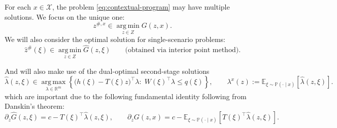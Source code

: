 \documentclass{article}
\newcommand{\R}{\mathbb{R}}
\newcommand{\E}{\mathbb{E}}
\newcommand{\argmin}{\operatorname*{arg\,min}}
\newcommand{\argmax}{\operatorname*{arg\,max}}
\theoremstyle{plain}
\begin{document}
For each $x\in\mathcal X$, the problem \eqref{eq:contextual-program} may have multiple solutions. We focus on
the unique one:
\begin{equation}
\label{eq:canonical-contextual-solution}
z^{\#,x}\in\argmin_{z\in Z}G(z,x).
\end{equation}
We will also consider the optimal solution for single-scenario problems:
\begin{equation}
\label{eq:canonical-single-scenario}
\hat z^{\#}(\xi)\in\argmin_{z\in Z}\hat G(z,\xi)\qquad \text{(obtained via interior point method)}.
\end{equation}

And will also make use of the dual-optimal second-stage solutions
\begin{equation}
\label{eq:contextual-dual}
\hat\lambda(z,\xi)\in
\argmax_{\lambda\in\R^{m}}
\left\{
\big(h(\xi)-T(\xi)z\big)^\top\lambda:\;W(\xi)^\top\lambda\le q(\xi)
\right\},
\qquad
\lambda^x(z):=\E_{\xi\sim\mathbb P(\cdot\mid x)}\!\left[\hat\lambda(z,\xi)\right].
\end{equation}
which are important due to the following fundamental identity following from Danskin's theorem:
\begin{equation}
\label{eq:danskin-contextual}
\partial_z \hat G(z,\xi)=c-T(\xi)^\top\hat\lambda(z,\xi),
\qquad
\partial_z G(z,x)=c-\E_{\xi\sim\mathbb P(\cdot\mid x)}\!\left[T(\xi)^\top\hat\lambda(z,\xi)\right].
\end{equation}
\end{document}
